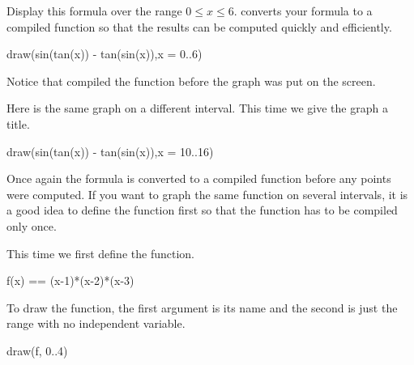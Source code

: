 \begin{psXtc}
\begin{xtccomment}
Display this formula over the range
$0 \leq x \leq 6$.
\Language{} converts your formula to a compiled
function so that the results can be computed
quickly and efficiently.
\end{xtccomment}
\begin{spadsrc}
draw(sin(tan(x)) - tan(sin(x)),x = 0..6)
\end{spadsrc}
\end{psXtc}

Notice that \Language{} compiled the function before the graph was put
on the screen.

\begin{psXtc}
\begin{xtccomment}
Here is the same graph on a different interval.
This time we give the graph a title.
\end{xtccomment}
\begin{spadsrc}
draw(sin(tan(x)) - tan(sin(x)),x = 10..16)
\end{spadsrc}
\end{psXtc}
%
Once again the formula is converted to a compiled function before
any points were computed.
If you want to graph the same function on several intervals, it is
a good idea to define the function first so that the function has
to be compiled only once.
\begin{xtc}
\begin{xtccomment}
This time we first define the function.
\end{xtccomment}
\begin{spadsrc}
f(x) == (x-1)*(x-2)*(x-3) 
\end{spadsrc}
\end{xtc}
\begin{psXtc}
\begin{xtccomment}
To draw the function, the first argument is its name
and the second is just the range with no independent variable.
\end{xtccomment}
\begin{spadsrc}
draw(f, 0..4) 
\end{spadsrc}
\end{psXtc}


